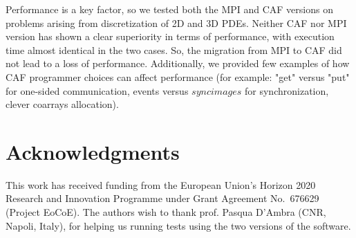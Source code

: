 \documentclass{IOS-Book-Article}
\begin{document}
Performance is a key factor, so we tested both the MPI and CAF versions on problems arising from discretization of 2D and 3D PDEs. Neither CAF nor MPI version has shown a clear superiority in terms of performance, with execution time almost identical in the two cases. So, the migration from MPI to CAF did not lead to a loss of performance.
Additionally, we provided few examples of how CAF programmer choices can affect performance (for example: "get" versus "put" for one-sided communication, events versus $sync images$ for synchronization, clever coarrays allocation).

\section{Acknowledgments} 
This work has received funding from the European Union's Horizon 2020 Research
and Innovation Programme under Grant Agreement No.~676629
(Project EoCoE).
The authors wish to thank prof. Pasqua D'Ambra (CNR, Napoli, Italy), for helping us running tests using the two versions of the software.
 


\end{document}
